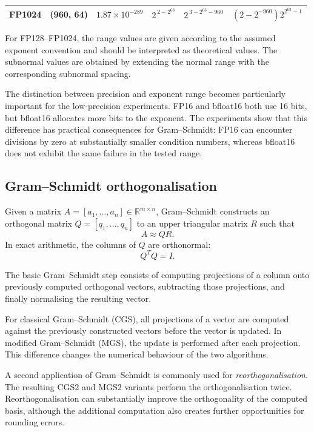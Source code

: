\documentclass[a4paper,11pt]{article}
\newcommand{\R}{\mathbb{R}}
\begin{document}
\begin{table}[ht]
\begin{tabular}{lccccc}
        FP1024    & (960, 64) & $1.87 \times 10^{-289}$
                  & $2^{\,2-2^{63}}$
                  & $2^{\,3-2^{63}-960}$
                  & $(2-2^{-960})2^{2^{63}-1}$ \\
        \bottomrule
    \end{tabular}
    \smallskip
    \parbox{0.95\textwidth}{\footnotesize
    For FP128--FP1024, the range values are given according to the assumed
    exponent convention and should be interpreted as theoretical values.
    The subnormal values are obtained by extending the normal range with
    the corresponding subnormal spacing.}
\end{table}

The distinction between precision and exponent range becomes particularly
important for the low-precision experiments. FP16 and bfloat16 both use
16 bits, but bfloat16 allocates more bits to the exponent. The experiments
show that this difference has practical consequences for Gram--Schmidt:
FP16 can encounter divisions by zero at substantially smaller condition
numbers, whereas bfloat16 does not exhibit the same failure in the tested
range.

\subsection{Gram--Schmidt orthogonalisation}

Given a matrix $A= [a_1,...,a_n] \in\R^{m\times n}$,
Gram--Schmidt constructs an orthogonal matrix $Q=[q_1,...,q_n]$
to an upper triangular matrix $R$ such that
\[
    A \approx QR.
\]
In exact arithmetic, the columns of $Q$ are orthonormal:
\[
    Q^TQ=I.
\]

The basic Gram--Schmidt step consists of computing projections of a column
onto previously computed orthogonal vectors, subtracting those projections,
and finally normalising the resulting vector.

For classical Gram--Schmidt (CGS), all projections of a vector are computed
against the previously constructed vectors before the vector is updated. In
modified Gram--Schmidt (MGS), the update is performed after each projection.
This difference changes the numerical behaviour of the two algorithms.

A second application of Gram--Schmidt is commonly used for
\emph{reorthogonalisation}. The resulting CGS2 and MGS2 variants perform the
orthogonalisation twice. Reorthogonalisation can substantially improve the
orthogonality of the computed basis, although the additional computation also
creates further opportunities for rounding errors.
\end{document}

